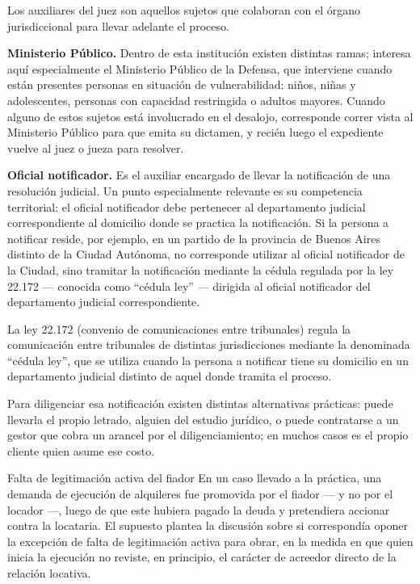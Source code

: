 \documentclass[12pt,oneside]{book}
\begin{document}
Los auxiliares del juez son aquellos sujetos que colaboran con el órgano jurisdiccional para llevar adelante el proceso.

\textbf{Ministerio Público.} Dentro de esta institución existen distintas ramas; interesa aquí especialmente el Ministerio Público de la Defensa, que interviene cuando están presentes personas en situación de vulnerabilidad: niños, niñas y adolescentes, personas con capacidad restringida o adultos mayores. Cuando alguno de estos sujetos está involucrado en el desalojo, corresponde correr vista al Ministerio Público para que emita su dictamen, y recién luego el expediente vuelve al juez o jueza para resolver.

\textbf{Oficial notificador.} Es el auxiliar encargado de llevar la notificación de una resolución judicial. Un punto especialmente relevante es su competencia territorial: el oficial notificador debe pertenecer al departamento judicial correspondiente al domicilio donde se practica la notificación. Si la persona a notificar reside, por ejemplo, en un partido de la provincia de Buenos Aires distinto de la Ciudad Autónoma, no corresponde utilizar al oficial notificador de la Ciudad, sino tramitar la notificación mediante la cédula regulada por la ley 22.172 --- conocida como ``cédula ley'' --- dirigida al oficial notificador del departamento judicial correspondiente.

\begin{important}
La ley 22.172 (convenio de comunicaciones entre tribunales) regula la comunicación entre tribunales de distintas jurisdicciones mediante la denominada ``cédula ley'', que se utiliza cuando la persona a notificar tiene su domicilio en un departamento judicial distinto de aquel donde tramita el proceso.
\end{important}

Para diligenciar esa notificación existen distintas alternativas prácticas: puede llevarla el propio letrado, alguien del estudio jurídico, o puede contratarse a un gestor que cobra un arancel por el diligenciamiento; en muchos casos es el propio cliente quien asume ese costo.

\begin{example}{Falta de legitimación activa del fiador}
En un caso llevado a la práctica, una demanda de ejecución de alquileres fue promovida por el fiador --- y no por el locador ---, luego de que este hubiera pagado la deuda y pretendiera accionar contra la locataria. El supuesto plantea la discusión sobre si correspondía oponer la excepción de falta de legitimación activa para obrar, en la medida en que quien inicia la ejecución no reviste, en principio, el carácter de acreedor directo de la relación locativa.
\end{example}
\end{document}
